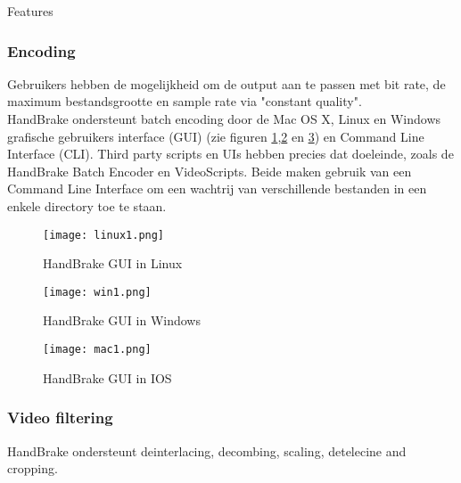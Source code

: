 \begin{subsectionbox}{Features}\end{subsectionbox}
\subsubsection{Encoding}

Gebruikers hebben de mogelijkheid om de output aan te passen met bit rate, de maximum bestandsgrootte en sample rate via "constant quality".\\

HandBrake ondersteunt batch encoding door de Mac OS X, Linux en Windows grafische gebruikers interface (GUI) (zie figuren \ref{fig:Lgui},\ref{fig:Wgui} en \ref{fig:Igui}) en Command Line Interface (CLI). Third party scripts en UIs hebben precies dat doeleinde, zoals de HandBrake Batch Encoder en VideoScripts. Beide maken gebruik van een Command Line Interface om een wachtrij van verschillende bestanden in een enkele directory toe te staan.

\begin{figure}[!hp]
\centering
\texttt{[image: linux1.png]}
\caption{HandBrake GUI in Linux}
\label{fig:Lgui}
\end{figure}
\newpage
\begin{figure}[!hp]
\centering
\texttt{[image: win1.png]}
\caption{HandBrake GUI in Windows}
\label{fig:Wgui}
\end{figure}
\begin{figure}[!h]
\centering
\texttt{[image: mac1.png]}
\caption{HandBrake GUI in IOS}
\label{fig:Igui}
\end{figure}
\newpage

\subsubsection{Video filtering}

HandBrake ondersteunt deinterlacing, decombing, scaling, detelecine and cropping.

